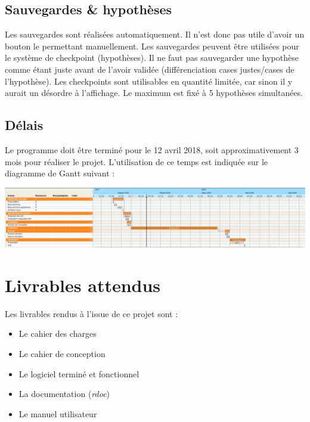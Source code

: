\documentclass{report}
\begin{document}
	\section{Sauvegardes \& hypothèses}
		Les sauvegardes sont réalisées automatiquement. Il n'est donc pas utile d'avoir un bouton le permettant manuellement. Les sauvegardes peuvent être utilisées pour le système de checkpoint (hypothèses). Il ne faut pas sauvegarder une hypothèse comme étant juste avant de l'avoir validée (différenciation cases justes/cases de l'hypothèse). Les checkpoints sont utilisables en quantité limitée, car sinon il y aurait un désordre à l'affichage. Le maximum est fixé à 5 hypothèses simultanées.
	
	\section{Délais}
		Le programme doit être terminé pour le 12 avril 2018, soit approximativement 3 mois pour réaliser le projet. L'utilisation de ce temps est indiquée sur le diagramme de Gantt suivant :

	\includegraphics{ganttGeneral.png}

		
		
\chapter{Livrables attendus}
	Les livrables rendus à l'issue de ce projet sont :
	\begin{itemize}
	\item Le cahier des charges
	\item Le cahier de conception
	\item Le logiciel terminé et fonctionnel
	\item La documentation (\textit{rdoc})
	\item Le manuel utilisateur
	\end{itemize}
		
		
		
\end{document}
